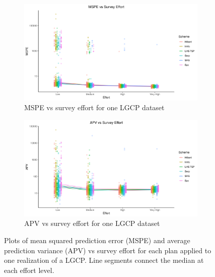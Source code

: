 \documentclass[review]{elsarticle}
\begin{document}
\begin{figure}

\begin{subfigure}{4.5in}
\includegraphics[width=4.5in]{../graphics/MSPE-effort-notpaneled-LGCP000004.png}
\caption{MSPE vs survey effort for one LGCP dataset}
\label{mspelgcp}
\end{subfigure}

\begin{subfigure}{4.5in}
\includegraphics[width=4.5in]{../graphics/APV-effort-notpaneled-LGCP000004.png}
\caption{APV vs survey effort for one LGCP dataset}
\label{apvlgcp}
\end{subfigure}

\caption{Plots of mean squared prediction error (MSPE) and average prediction
variance (APV) vs survey effort for each plan applied to one realization of a
LGCP. Line segments connect the median at each effort level.}
\label{lgcpresults}
\end{figure}

%
%
%
\end{document}
